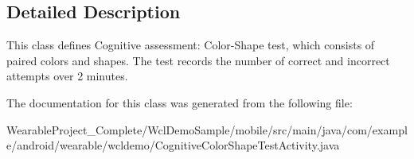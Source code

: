 \subsection{Detailed Description}
This class defines Cognitive assessment\+: Color-\/\+Shape test, which consists of paired colors and shapes. The test records the number of correct and incorrect attempts over 2 minutes. 

The documentation for this class was generated from the following file\+:\begin{DoxyCompactItemize}
\item 
Wearable\+Project\+\_\+\+Complete/\+Wcl\+Demo\+Sample/mobile/src/main/java/com/example/android/wearable/wcldemo/Cognitive\+Color\+Shape\+Test\+Activity.\+java\end{DoxyCompactItemize}
